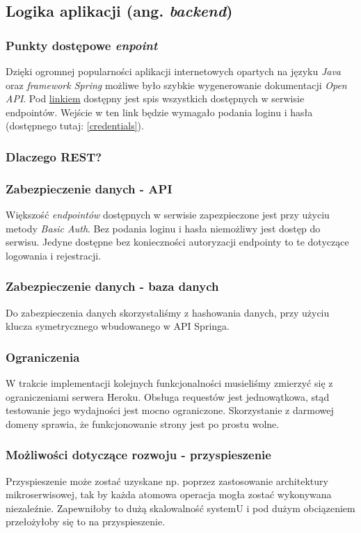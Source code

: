 \subsection{Logika aplikacji (ang. \textit{backend})}
\subsubsection{Punkty dostępowe \textit{enpoint}}
Dzięki ogromnej popularności aplikacji internetowych opartych na języku \textit{Java} oraz \textit{framework Spring} możliwe było szybkie wygenerowanie dokumentacji \textit{Open API}. Pod \href{https://trunk-kartapacjentaservice.herokuapp.com/swagger-ui.html} {linkiem} dostępny jest spis wszystkich dostępnych w serwisie endpointów. Wejście w ten link będzie wymagało podania loginu i hasła (dostępnego tutaj: \ref{credentials}).

\clearpage
\subsubsection{Dlaczego REST?}


\subsubsection{Zabezpieczenie danych - API}
Większość \textit{endpointów} dostępnych w serwisie zapezpieczone jest przy użyciu metody \textit{Basic Auth}. Bez podania loginu i hasła niemożliwy jest dostęp do serwisu. Jedyne dostępne bez konieczności autoryzacji endpointy to te dotyczące logowania i rejestracji.

\subsubsection{Zabezpieczenie danych - baza danych}
Do zabezpieczenia danych skorzystaliśmy z hashowania danych, przy użyciu klucza symetrycznego wbudowanego w API Springa.

\subsubsection{Ograniczenia}
W trakcie implementacji kolejnych funkcjonalności musieliśmy zmierzyć się z ograniczeniami serwera Heroku. Obsługa requestów jest jednowątkowa, stąd testowanie jego wydajności jest mocno ograniczone.
Skorzystanie z darmowej domeny sprawia, że funkcjonowanie strony jest po prostu wolne.
\subsubsection{Możliwości dotyczące rozwoju - przyspieszenie}
Przyspieszenie może zostać uzyskane np. poprzez zastosowanie architektury mikroserwisowej, tak by każda atomowa operacja mogła zostać wykonywana niezaleźnie. Zapewniłoby to dużą skalowalność systemU i pod dużym obciązeniem przełożyłoby się to na przyspieszenie. 